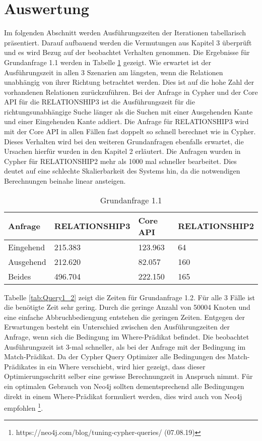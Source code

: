 \section{Auswertung}
Im folgenden Abschnitt werden Ausführungszeiten der Iterationen tabellarisch präsentiert.  Darauf aufbauend werden die Vermutungen aus Kapitel 3 überprüft und es wird Bezug auf der beobachtet Verhalten genommen. \newline \newline
Die Ergebnisse für Grundanfrage 1.1 werden  in Tabelle \ref{tab:Query1_1} gezeigt. Wie erwartet ist der Ausführungszeit in allen 3 Szenarien am längsten, wenn die Relationen unabhängig von ihrer Richtung betrachtet werden. Dies ist auf die hohe Zahl der vorhandenen Relationen zurückzuführen. Bei der Anfrage in Cypher und der Core API für die RELATIONSHIP3  ist die Ausführungszeit für die richtungsunabhängige Suche länger als die Suchen mit einer Ausgehenden Kante und einer Eingehenden Kante addiert. \newline
Die Anfrage für RELATIONSHIP3 wird mit der Core API in  allen Fällen fast doppelt so schnell berechnet wie in Cypher. Dieses Verhalten wird bei den weiteren Grundanfragen ebenfalls erwartet, die Ursachen hierfür wurden in den Kapitel 2 erläutert. \newline
Die Anfragen wurden in Cypher für RELATIONSHIP2 mehr als 1000 mal schneller bearbeitet. Dies deutet auf eine schlechte Skalierbarkeit des Systems hin, da die notwendigen Berechnungen beinahe linear ansteigen. 
\FloatBarrier  
\begin{table}[h]
\centering
\begin{tabular}{ |p{3cm}||p{3cm}|p{3cm}|p{3cm}|  }
	\hline
	Anfrage& RELATIONSHIP3 &Core API&RELATIONSHIP2\\
	\hline
	Eingehend   & 215.383    &123.963&  64\\
	Ausgehend&    212.620  & 82.057   & 160\\
	Beides&496.704 & 222.150&  165\\
	\hline
\end{tabular}
\caption{Grundanfrage 1.1}
\label{tab:Query1_1}
\end{table}
\FloatBarrier
Tabelle \ref{tab:Query1_2} zeigt die Zeiten für Grundanfrage 1.2. Für alle 3 Fälle ist die benötigte Zeit sehr gering. Durch die geringe Anzahl von 50004 Knoten und eine einfache Abbruchbediengung entstehen die geringen Zeiten. \newline Entgegen der Erwartungen besteht ein Unterschied zwischen den Ausführungzeiten der Anfrage, wenn sich die Bedingung im Where-Prädikat befindet. Die beobachtet Ausführungszeit ist 3-mal schneller, als bei der Anfrage mit der Bedingung im Match-Prädikat. Da der Cypher Query Optimizer alle Bedingungen des Match-Prädikates in ein Where verschiebt, wird hier gezeigt, dass dieser Optimierungsschritt selber eine gewisse Berechnungzeit in Anspruch nimmt. Für ein optimalen Gebrauch von Neo4j sollten dementsprechend alle Bedingungen direkt in einem Where-Prädikat formuliert werden, dies wird auch von Neo4j empfohlen \footnote{https://neo4j.com/blog/tuning-cypher-queries/ (07.08.19)}. \newline
